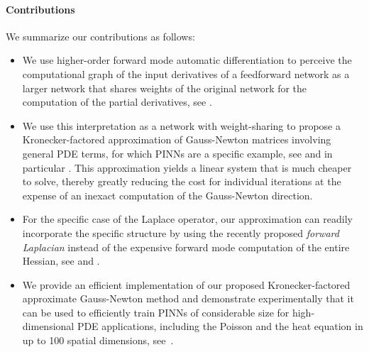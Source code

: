 \paragraph{Contributions} %
We summarize our contributions as follows:
\begin{itemize}
    \item We use higher-order forward mode automatic differentiation to perceive the computational graph of the input derivatives of a feedforward network as a larger network that shares weights of the original network for the computation of the partial derivatives, see .

    \item We use this interpretation as a network with weight-sharing
    to propose a Kronecker-factored approximation of Gauss-Newton matrices involving general PDE terms, for which PINNs are a specific example,
    see  and in particular .
    This approximation yields a linear system that is much cheaper to solve, thereby greatly reducing the cost for individual iterations at the expense of an inexact computation of the Gauss-Newton direction.

    \item For the specific case of the Laplace operator, our approximation can readily incorporate the specific structure by using the recently proposed \emph{forward Laplacian} instead of the expensive forward mode computation of the entire Hessian, see  and .

    \item We provide an efficient implementation of our proposed Kronecker-factored approximate Gauss-Newton method and demonstrate experimentally that it can be used to efficiently train PINNs of considerable size for high-dimensional PDE applications, including the Poisson and the heat equation in up to 100 spatial dimensions, see~.
\end{itemize}

